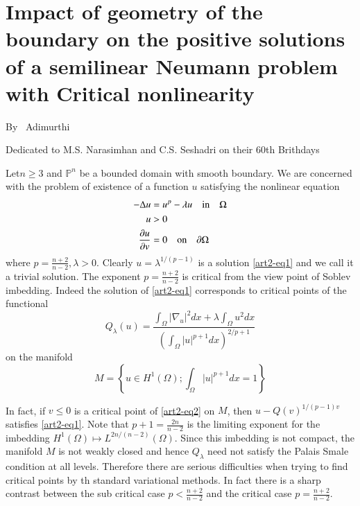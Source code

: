 \chapter{Impact of geometry of the boundary on the positive solutions of a semilinear Neumann problem with Critical nonlinearity}\label{chap2}

\begin{center}
By~ Adimurthi
\end{center}


\begin{center}
Dedicated to M.S. Narasimhan and C.S. Seshadri on their 60th Brithdays
\end{center}

Let\pageoriginale $n\geq3$ and $\mathbb{P}^{n}$ be a bounded domain with smooth boundary. We are concerned with the problem
of existence of a function $u$ satisfying the nonlinear equation
\begin{align}
-\Delta u &= u^{p}-\lambda u \quad{\rm in}\quad \Omega \nonumber\\
u &> 0 \nonumber\\
\dfrac{\partial u}{\partial v} &= 0 \quad {\rm on}\quad \partial \Omega \label{art2-eq1} 
\end{align}
where $p=\frac{n+2}{n-2},\lambda > 0$. Clearly $u=\lambda^{1/(p-1)}$ is a solution \ref{art2-eq1} and we call it a trivial solution. The exponent $p=\frac{n+2}{n-2}$ is critical from the view point of Soblev imbedding. Indeed the solution of \ref{art2-eq1} corresponds to critical points of the functional
\begin{equation}
Q_{\lambda}(u) = \dfrac{\int_{\Omega}|\nabla_{u}|^{2}dx + \lambda\int_{\Omega}u^{2}dx}{\left(\int_{\Omega}|u|^{p+1}dx\right)^{2/p+1}}\label{art2-eq2}
\end{equation}
on the manifold
\begin{equation}
M =\left\{u\in H^{1} (\Omega) ; \int_{\Omega}|u|^{p+1}dx=1\right\}\label{art2-eq3}
\end{equation}

In fact, if $v\leq 0$ is a critical point of \ref{art2-eq2} on $M$, then $u-Q(v)^{1/(p-1)v}$ satisfies \ref{art2-eq1}. Note that $p+1 =\frac{2n}{n-2}$ is the limiting exponent for the imbedding $H^{1}(\Omega)\mapsto L^{2n/(n-2)}(\Omega)$. Since this imbedding is not compact, the manifold $M$ is not weakly closed and hence $Q_{\lambda}$ need not satisfy the Palais Smale condition at all levels. Therefore there are serious difficulties when trying to find critical points by th standard variational methods. In fact there is a sharp contrast between the sub critical case $p<\frac{n+2}{n-2}$ and the critical case $p=\frac{n+2}{n-2}$.
  
